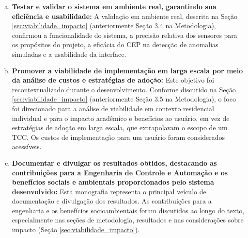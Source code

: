 \begin{enumerate}[a)]
    \item \textbf{Testar e validar o sistema em ambiente real, garantindo sua eficiência e usabilidade:} A validação em ambiente real, descrita na Seção \ref{sec:viabilidade_impacto} (anteriormente Seção 3.4 na Metodologia), confirmou a funcionalidade do sistema, a precisão relativa dos sensores para os propósitos do projeto, a eficácia do CEP na detecção de anomalias simuladas e a usabilidade da interface.

    \item \textbf{Promover a viabilidade de implementação em larga escala por meio da análise de custos e estratégias de adoção:} Este objetivo foi recontextualizado durante o desenvolvimento. Conforme discutido na Seção \ref{sec:viabilidade_impacto} (anteriormente Seção 3.5 na Metodologia), o foco foi direcionado para a análise de viabilidade em contexto residencial individual e para o impacto acadêmico e benefícios ao usuário, em vez de estratégias de adoção em larga escala, que extrapolavam o escopo de um TCC. Os custos de implementação para um usuário foram considerados acessíveis.

    \item \textbf{Documentar e divulgar os resultados obtidos, destacando as contribuições para a Engenharia de Controle e Automação e os benefícios sociais e ambientais proporcionados pelo sistema desenvolvido:} Esta monografia representa o principal veículo de documentação e divulgação dos resultados. As contribuições para a engenharia e os benefícios socioambientais foram discutidos ao longo do texto, especialmente nas seções de metodologia, resultados e nas considerações sobre impacto (Seção \ref{sec:viabilidade_impacto}).
\end{enumerate}


